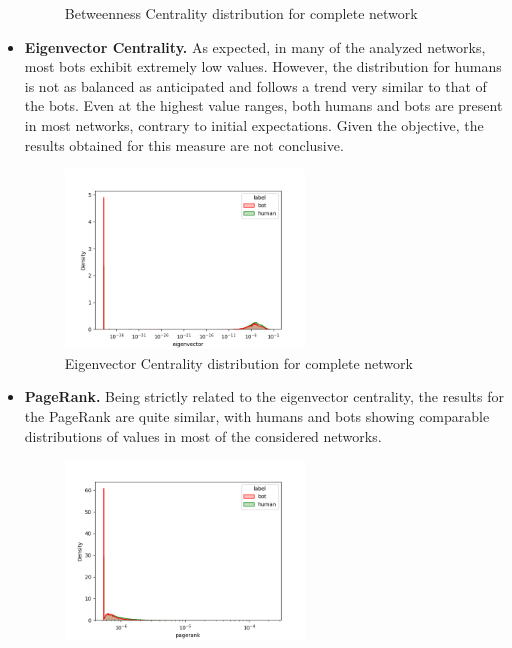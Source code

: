 \documentclass[12pt, a4paper]{article}
\begin{document}
\begin{itemize}
\begin{figure}[H]
                    \caption{Betweenness Centrality distribution for complete network}
                    \label{fig:betweenness}
                \end{figure}
			\item \textbf{Eigenvector Centrality.} As expected, in many of the analyzed networks, most bots exhibit extremely low values. However, the distribution for humans is not as balanced as anticipated and follows a trend very similar to that of the bots. Even at the highest value ranges, both humans and bots are present in most networks, contrary to initial expectations. Given the objective, the results obtained for this measure are not conclusive.
				\begin{figure}[H]
                    \centering
                    \includegraphics[width=0.6\textwidth]{complete_eigenvector_distribution.png}
                    \caption{Eigenvector Centrality distribution for complete network}
                \end{figure}      
			\item \textbf{PageRank.} Being strictly related to the eigenvector centrality, the results for the PageRank are quite similar, with humans and bots showing comparable distributions of values in most of the considered networks.
                \begin{figure}[H]
                    \centering
                    \includegraphics[width=0.6\textwidth]{complete_pagerank_distribution.png}

\end{figure}
\end{itemize}
\end{document}
